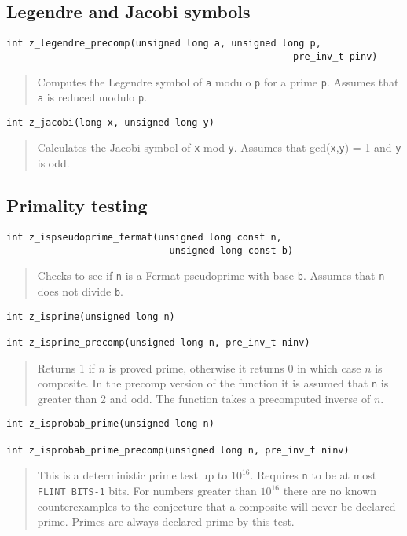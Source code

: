\documentclass[a4paper,10pt]{article}
\newcommand{\code}{\lstinline}
\begin{document}
\subsection{Legendre and Jacobi symbols}

\begin{lstlisting}
int z_legendre_precomp(unsigned long a, unsigned long p, 
                                                   pre_inv_t pinv)
\end{lstlisting}
\begin{quote}
Computes the Legendre symbol of \code{a} modulo \code{p} for a prime \code{p}. Assumes that \code{a} is reduced modulo \code{p}.
\end{quote}

\begin{lstlisting}
int z_jacobi(long x, unsigned long y)
\end{lstlisting}
\begin{quote}
Calculates the Jacobi symbol of \code{x} mod \code{y}. Assumes that gcd(\code{x},\code{y}) = 1 and \code{y} is odd.  
\end{quote}

\subsection{Primality testing}

\begin{lstlisting}
int z_ispseudoprime_fermat(unsigned long const n,
                             unsigned long const b)
\end{lstlisting}
\begin{quote}
Checks to see if \code{n} is a Fermat pseudoprime with base \code{b}.  Assumes that \code{n} does not divide \code{b}. 
\end{quote}

\begin{lstlisting}
int z_isprime(unsigned long n)

int z_isprime_precomp(unsigned long n, pre_inv_t ninv)
\end{lstlisting}
\begin{quote}
Returns 1 if $n$ is proved prime, otherwise it returns 0 in which case $n$ is composite. In the precomp version of the function it is assumed that \code{n} is greater than 2 and odd. The function takes a precomputed inverse of $n$.
\end{quote}

\begin{lstlisting}
int z_isprobab_prime(unsigned long n)

int z_isprobab_prime_precomp(unsigned long n, pre_inv_t ninv)
\end{lstlisting}
\begin{quote}
This is a deterministic prime test up to $10^{16}$. Requires \code{n} to be at most \code{FLINT_BITS-1} bits.  For numbers greater than $10^{16}$ there are no known counterexamples to the conjecture that a composite will never be declared prime. Primes are always declared prime by this test.
\end{quote}
\end{document}
